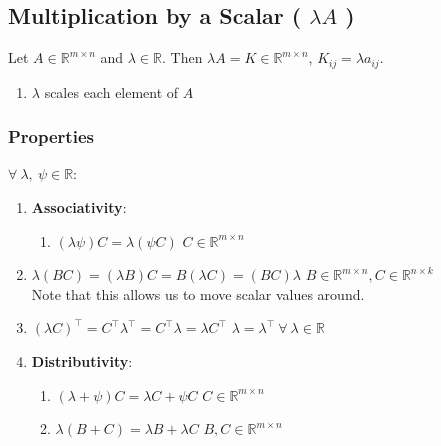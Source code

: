 \subsection{Multiplication by a Scalar ( $\lambda A$ )}

Let $A \in \mathbb{R}^{m\times n}$ and $\lambda \in \mathbb{R}$. Then $\lambda A = K \in \mathbb{R}^{m\times n}$, $K_{ij} = \lambda a_{ij}$.
\hfill \cite{mfml/book/mml/Deisenroth-Faisal-Ong}


\begin{enumerate}
    \item $\lambda$ scales each element of $A$
    \hfill \cite{mfml/book/mml/Deisenroth-Faisal-Ong}

    
\end{enumerate}


\subsubsection{Properties}

$\forall\ \lambda,\ \psi \in \mathbb{R}$:
\vspace{0.2cm}
\begin{enumerate}[itemsep=0.2cm]
    \item \textbf{Associativity}:
    \begin{enumerate}
        \item $(\lambda \psi )C = \lambda (\psi C)$ \hfill $C \in  \mathbb{R}^{m\times n}$
        \hfill \cite{mfml/book/mml/Deisenroth-Faisal-Ong}
    \end{enumerate}

    \item $\lambda (BC) = (\lambda B)C = B(\lambda C) = (BC)\lambda $ \hfill $B \in  \mathbb{R}^{m\times n}, C \in  \mathbb{R}^{n\times k}$
    \hfill \cite{mfml/book/mml/Deisenroth-Faisal-Ong}
    \\
    Note that this allows us to move scalar values around.
    \hfill \cite{mfml/book/mml/Deisenroth-Faisal-Ong}

    \item $(\lambda C) ^\top  = C^\top \lambda ^\top  = C^\top \lambda  = \lambda C^\top $
    \hfill $\lambda  = \lambda ^\top \  \forall \ \lambda  \in  \mathbb{R}$
    \hfill \cite{mfml/book/mml/Deisenroth-Faisal-Ong}

    \item \textbf{Distributivity}:
    \begin{enumerate}
        \item $(\lambda  + \psi )C = \lambda C + \psi C$
        \hfill $C \in  \mathbb{R}^{m\times n}$
        \hfill \cite{mfml/book/mml/Deisenroth-Faisal-Ong}

        \item $\lambda (B + C) = \lambda B + \lambda C$
        \hfill $B, C \in  \mathbb{R}^{m\times n}$
        \hfill \cite{mfml/book/mml/Deisenroth-Faisal-Ong}
        
    \end{enumerate}
\end{enumerate}





